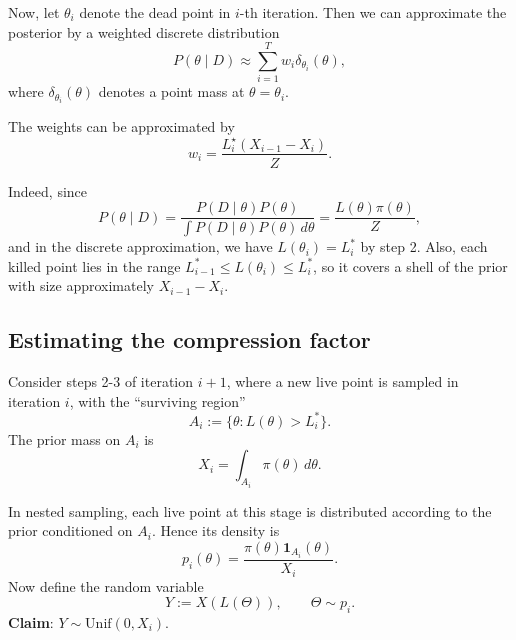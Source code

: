 \documentclass[11pt, titlepage]{article} %
\numberwithin{equation}{section}
\theoremstyle{definition}
\numberwithin{assumption}{section}
\begin{document}
Now, let $\theta_i$ denote the dead point in $i$-th iteration. Then we can approximate the posterior by a weighted discrete distribution
\begin{equation*}
    P(\theta\mid D)\approx\sum_{i=1}^T w_i\delta_{\theta_i}(\theta),
\end{equation*}
where $\delta_{\theta_i}(\theta)$ denotes a point mass at $\theta=\theta_i$.

The weights can be approximated by
\begin{equation*}
    w_i=\frac{L_i^\star (X_{i-1}-X_i)}{Z}.
\end{equation*}

Indeed, since
\begin{equation*}
    P(\theta\mid D)=\frac{P(D\mid\theta)P(\theta)}{\int P(D\mid\theta)P(\theta)\,d\theta}=\frac{L(\theta)\pi(\theta)}{Z},
\end{equation*}
and in the discrete approximation, we have $L(\theta_i)=L^*_i$ by step 2. Also, each killed point lies in the range $L^*_{i-1}\le L(\theta_i)\le L^*_i$, so it covers a shell of the prior with size approximately $X_{i-1}-X_i$.

\subsection{Estimating the compression factor}


Consider steps 2-3 of iteration $i+1$, where a new live point is sampled in iteration $i$, with the ``surviving region''
\begin{equation*}
A_i:=\{\theta: L(\theta)>L_i^*\}.
\end{equation*}
The prior mass on $A_i$ is
\begin{equation*}
X_i=\int_{A_i} \pi(\theta)\,d\theta.
\end{equation*}

In nested sampling, each live point at this stage is distributed according to the
prior conditioned on \(A_i\). Hence its density is
\begin{equation*}
p_i(\theta)
=
\frac{\pi(\theta)\mathbf{1}_{A_i}(\theta)}{X_i}.
\end{equation*}
Now define the random variable
\begin{equation*}
Y:=X(L(\Theta)),
\qquad \Theta\sim p_i.
\end{equation*}
\textbf{Claim}: $Y\sim \mathrm{Unif}(0,X_i)$.
\end{document}
